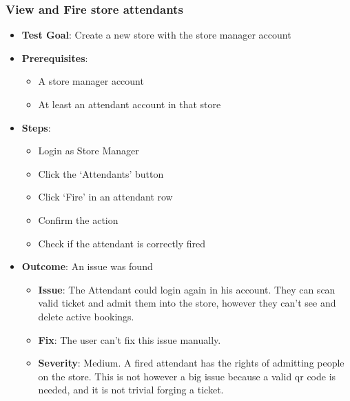 \subsubsection{View and Fire store attendants}
\begin{itemize}
    \item \textbf{Test Goal}: Create a new store with the store manager account
    \item \textbf{Prerequisites}:
        \begin{itemize}
            \item A store manager account
            \item At least an attendant account in that store
        \end{itemize}
    \item \textbf{Steps}:
    \begin{itemize}
        \item Login as Store Manager
        \item Click the `Attendants' button
        \item Click `Fire' in an attendant row
        \item Confirm the action
        \item Check if the attendant is correctly fired
    \end{itemize}
    \item \textbf{Outcome}:  An issue was found
    \begin{itemize}
        \item \textbf{Issue}: The Attendant could login again in his account. They can scan valid ticket and admit them into the store, however they can't see and
            delete active bookings.
        \item \textbf{Fix}: The user can't fix this issue manually.
        \item \textbf{Severity}: Medium. A fired attendant has the rights of admitting people on the store. This is not however a big issue because a valid qr code is 
            needed, and it is not trivial forging a ticket.
    \end{itemize}
\end{itemize} 